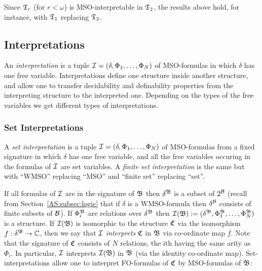 \begin{remark} 
Since $\mathfrak{T}_r$ (for $r < \omega$) is MSO-interpretable in $\mathfrak{T}_2$, the results above hold, for instance, with $\mathfrak{T}_1$ replacing $\mathfrak{T}_2$.
\end{remark}

\subsection{Interpretations}

 

An \emph{interpretation} is a tuple ${\mathcal I} = (\delta, \Phi_1, \dots, 
\Phi_N)$ of MSO-formulas in which $\delta$ has one free variable. Interpretations define one structure inside another structure, 
and allow one to transfer decidability and definability properties from the interpreting structure 
to the interpreted one. Depending on the types of the free variables 
we get different types of interpretations.

\subsubsection{Set Interpretations}

\begin{definition}
A \emph{set interpretation} is a tuple  ${\mathcal I} = (\delta, \Phi_1, \dots, 
\Phi_N)$ of MSO-formulas from a fixed signature in which $\delta$ has one free variable, and all the free variables occuring in the formulas of ${\mathcal I}$ are set variables.
A \emph{finite set interpretation} is the same but with ``WMSO'' replacing ``MSO'' and ``finite set'' replacing ``set''.
\end{definition}

If all formulas of ${\mathcal I}$ are in the signature of $\mathfrak{B}$ then $\delta^{\mathfrak{B}}$ is a subset of $2^{\mathcal B}$ (recall from Section~\ref{AS:subsec:logic} that if $\delta$ is a WMSO-formula then $\delta^{\mathcal B}$ consists of finite subsets of ${\mathcal B}$). If $\Phi_i^{\mathfrak{B}}$ are relations over $\delta^{\mathfrak{B}}$ then ${\mathcal I}(\mathfrak{B}) := (\delta^{\mathfrak{B}}, \Phi_1^{\mathfrak{B}}, \dots, \Phi_N^{\mathfrak{B}})$ is a structure. 
If ${\mathcal I}(\mathfrak{B})$ is isomorphic to the structure $\mathfrak{C}$ via the isomorphism $f:\delta^{\mathfrak{B}} \to \mathbb{C}$, then we say that ${\mathcal I}$ \emph{interprets} $\mathfrak{C}$ in $\mathfrak{B}$ via co-ordinate map $f$. Note that the signature of $\mathfrak{C}$ consists of $N$ relations, the ith having the same arity as $\Phi_i$. In particular, ${\mathcal I}$ interprets ${\mathcal I}(\mathfrak{B})$ in $\mathfrak{B}$ (via the identity co-ordinate map). Set-interpretations allow one to interpret FO-formulas of $\mathfrak{C}$ by MSO-formulas of $\mathfrak{B}$:

